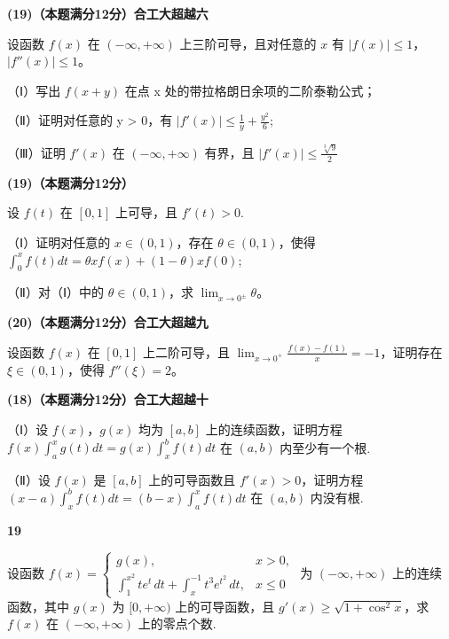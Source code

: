 \documentclass[a4paper,12pt]{article}
\begin{document}
\textbf{(19)（本题满分12分）合工大超越六}

设函数 $f(x)$ 在 $(-∞,+∞)$ 上三阶可导，且对任意的 $x$ 有 $\left|f(x)\right| \leqslant 1$， $\left|f''(x)\right| \leqslant 1$。

（Ⅰ）写出 $f(x+y)$ 在点 x 处的带拉格朗日余项的二阶泰勒公式；

（Ⅱ）证明对任意的 y > 0，有 $\left|f'(x)\right| \leqslant \frac{1}{y} + \frac{y^{2}}{6}$;

（Ⅲ）证明 $f'(x)$ 在 $(-∞,+∞)$ 有界，且 $\left|f'(x)\right|\leqslant\frac{\sqrt[3]{9}}{2}$

\vspace{0.5cm}

\textbf{(19)（本题满分12分）}

设 $f(t)$ 在 $[0,1]$ 上可导，且 $f'(t) > 0$.

（Ⅰ）证明对任意的 $x \in (0,1)$，存在 $\theta \in (0,1)$，使得 $\int_{0}^{x} f(t) dt = \theta x f(x) + (1 - \theta) x f(0)$;

（Ⅱ）对（Ⅰ）中的 $\theta \in (0,1)$，求 $\lim_{x\to0^{\pm}} \theta$。

\vspace{0.5cm}

\textbf{(20)（本题满分12分）合工大超越九}

设函数 $f(x)$ 在 $[0,1]$ 上二阶可导，且 $\lim_{x\to0^{+}}\frac{f(x)-f(1)}{x}=-1$，证明存在 $\xi\in(0,1)$，使得 $f''(\xi)=2$。

\vspace{0.5cm}

\textbf{(18)（本题满分12分）合工大超越十}

（Ⅰ）设 $f(x)$，$g(x)$ 均为 $[a,b]$ 上的连续函数，证明方程 $f(x)\int_{a}^{x}g(t)dt = g(x)\int_{x}^{b}f(t)dt$ 在 $(a,b)$ 内至少有一个根.

（Ⅱ）设 $f(x)$ 是 $[a,b]$ 上的可导函数且 $f'(x)>0$，证明方程 $(x-a)\int_{x}^{b}f(t)dt=(b-x)\int_{a}^{x}f(t)dt$ 在 $(a,b)$ 内没有根.

\vspace{0.5cm}

\textbf{19}

设函数 $f(x) = \begin{cases} g(x), & x > 0, \\ \int_{1}^{x^{2}} t e^{t} \, dt + \int_{x}^{-1} t^{3} e^{t^{2}} \, dt, & x \leqslant 0 \end{cases}$ 为 $(- \infty, + \infty)$ 上的连续函数，其中 $g(x)$ 为 $[0, +\infty)$ 上的可导函数，且 $g'(x) \geqslant \sqrt{1 + \cos^{2}x}$，求 $f(x)$ 在 $(- \infty, + \infty)$ 上的零点个数.
\end{document}
